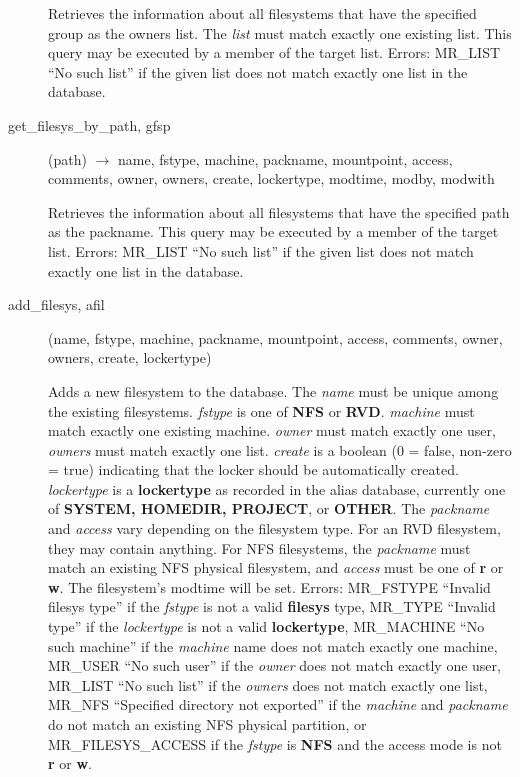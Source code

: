 \begin{description}
Retrieves the information about all filesystems that have the
specified group as the owners list.  The {\em list} must match exactly
one existing list.  This query may be executed by a member of the
target list.  Errors: MR\_LIST ``No such list'' if the given list does
not match exactly one list in the database.

\item[get\_filesys\_by\_path, gfsp](path) $\rightarrow$ name, fstype,
machine, packname, mountpoint, access, comments, owner, owners,
create, lockertype, modtime, modby, modwith

Retrieves the information about all filesystems that have the
specified path as the packname.  This query may be executed by a
member of the target list.  Errors: MR\_LIST ``No such list'' if the
given list does not match exactly one list in the database.

\item[add\_filesys, afil](name, fstype, machine, packname, mountpoint,
access, comments, owner, owners, create, lockertype)

Adds a new filesystem to the database.  The {\em name} must be unique
among the existing filesystems.  {\em fstype} is one of {\bf NFS} or
{\bf RVD}.  {\em machine} must match exactly one existing machine.
{\em owner} must match exactly one user, {\em owners} must match exactly
one list.  {\em create} is a boolean (0 = false, non-zero = true)
indicating that the locker should be automatically created.
{\em lockertype} is a {\bf lockertype} as recorded in the alias database,
currently one of {\bf SYSTEM, HOMEDIR, PROJECT}, or {\bf OTHER}.  The
{\em packname} and {\em access} vary depending on the filesystem type.
For an RVD filesystem, they may contain anything.  For NFS
filesystems, the {\em packname} must match an existing NFS physical
filesystem, and {\em access} must be one of {\bf r} or {\bf w}.  The
filesystem's modtime will be set.  Errors: MR\_FSTYPE ``Invalid filesys
type'' if the {\em fstype} is not a valid {\bf filesys} type, MR\_TYPE
``Invalid type'' if the {\em lockertype} is not a valid {\bf lockertype},
MR\_MACHINE ``No such machine'' if the {\em machine} name does not match
exactly one machine, MR\_USER ``No such user'' if the {\em owner} does not
match exactly one user, MR\_LIST ``No such list'' if the {\em owners} does
not match exactly one list, MR\_NFS ``Specified directory not exported''
if the {\em machine} and {\em packname} do not match an existing NFS
physical partition, or MR\_FILESYS\_ACCESS if the {\em fstype} is {\bf NFS}
and the access mode is not {\bf r} or {\bf w}.


\end{description}
